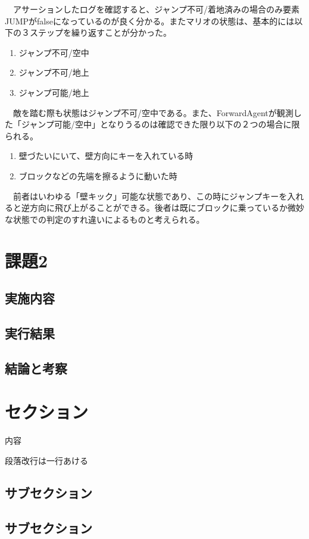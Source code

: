 \documentclass[a4j]{jarticle}
\begin{document}
\begin{description}
　アサーションしたログを確認すると、ジャンプ不可/着地済みの場合のみ要素JUMPがfalseになっているのが良く分かる。またマリオの状態は、基本的には以下の３ステップを繰り返すことが分かった。
\begin{enumerate}
 \item ジャンプ不可/空中
 \item ジャンプ不可/地上
 \item ジャンプ可能/地上
\end{enumerate}
　敵を踏む際も状態はジャンプ不可/空中である。また、ForwardAgentが観測した「ジャンプ可能/空中」となりうるのは確認できた限り以下の２つの場合に限られる。
\begin{enumerate}
 \item 壁づたいにいて、壁方向にキーを入れている時
 \item ブロックなどの先端を擦るように動いた時
\end{enumerate}
　前者はいわゆる「壁キック」可能な状態であり、この時にジャンプキーを入れると逆方向に飛び上がることができる。後者は既にブロックに乗っているか微妙な状態での判定のすれ違いによるものと考えられる。
\end{description}


\section{課題2}
\subsection{実施内容}
\subsection{実行結果}
\subsection{結論と考察}


\section{セクション}
内容

段落改行は一行あける
\subsection{サブセクション}
\subsection{サブセクション}
\end{document}
